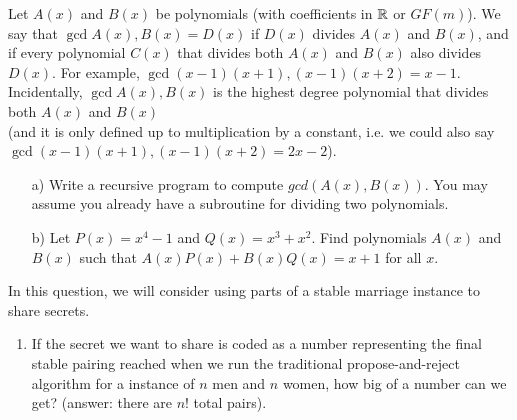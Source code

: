 \documentclass[]{article}
\newif\ifsolutions
\renewcommand{\answer}[1]{{\color{mydarkblue}\textbf{Solution:}#1}}
\begin{document}
\begin{qunlist}
Let $A(x)$ and $B(x)$ be polynomials (with coefficients in $\mathbb{R}$ or $GF(m)$). 
We say that  $\gcd{A(x), B(x)} = D(x)$ if $D(x)$ divides $A(x)$ and $B(x)$,
and if every polynomial $C(x)$ that divides both $A(x)$ and $B(x)$ also 
divides $D(x)$. 
For example, $\gcd{(x-1)(x+1), (x-1)(x+2)} = x-1$.
Incidentally, $\gcd{A(x), B(x)}$ is the highest degree polynomial
that divides both $A(x)$ and $B(x)$ \\
(and it is only defined up to multiplication by a constant,
i.e. we could also say $\gcd{(x-1)(x+1), (x-1)(x+2)} = 2x-2$).


\begin{itemize}
\qpart
\item[a)] Write a recursive program to compute $gcd(A(x),B(x))$. 
You may assume you already have a subroutine for dividing two polynomials. 


\ifsolutions{\answer
{
Consider the following recursive definition $F$:
\begin{itemize}
\item $F(A(x), 0) = A(x)$.
\item If $A(x) = B(x) Q(x) + R(x)$ with $\deg{R(x)} < \deg{B(x)}$, then
\[
F(A(x), B(x)) = F(B(x), R(x)).
\] 
($\deg{P(x)}$ denotes the degree of $P(x)$.) 
\end{itemize}
}}\fi


\qpart
\item[b)] Let $P(x) = x^4 - 1$ and $Q(x) = x^3 + x^2$.
Find polynomials $A(x)$ and $B(x)$ such that $A(x) P(x) + B(x) Q(x) = x + 1$ for all $x$. 


\ifsolutions{\answer
{
P(x)
}}\fi


\end{itemize}



\qpart




In this question, we will consider using parts of a stable marriage instance to share secrets. 

\begin{enumerate}
\qpart
\item  If the secret we want to share is coded as a number representing the final stable pairing reached when we run the traditional propose-and-reject algorithm for a instance of $n$ men and $n$ women, how big of a number can we get? (answer: there are $n!$ total pairs).


\end{enumerate}
\end{qunlist}
\end{document}
